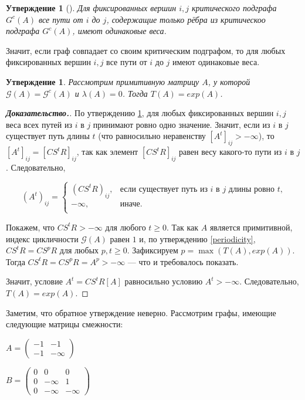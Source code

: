 \documentclass[12pt]{article}
\newtheorem{proposition}[theorem]{Утверждение}
\theoremstyle{definition}
\begin{document}
\begin{proposition} [{\cite[следствие 3.97]{synchronizationAndLinearity}}]
\label{sameWeight}
Для фиксированных вершин $i, j$ критического подграфа $G^c(A)$ все пути от $i$ до $j$, содержащие только рёбра из критическоо подграфа $G^c(A)$, имеют одинаковые веса.
\end{proposition}

Значит, если граф совпадает со своим критическим подграфом, то для любых фиксированных вершин $i, j$ все пути от $i$ до $j$ имеют одинаковые веса.

\begin{proposition} \label{onePathProposition}
Рассмотрим примитивную матрицу $A$, у которой $\mathcal{G}(A) = \mathcal{G}^c(A)$ и $\lambda(A) = 0$. Тогда $T(A) = exp(A)$.
\end{proposition}
\begin{proof}[\textbf{Доказательство.}]
По утверждению \ref{sameWeight}, для любых фиксированных вершин $i, j$ веса всех путей из $i$ в $j$ принимают ровно одно значение. Значит, если из $i$ в $j$ существует путь длины $t$ (что равносильно неравенству $[A^t]_{ij} > -\infty$), то $[A^t]_{ij} = [CS^tR]_{ij}$, так как элемент $[CS^tR]_{ij}$ равен весу какого-то пути из $i$ в $j$. Следовательно,

\begin{equation*}
(A^t)_{ij} = \begin{cases}(CS^tR)_{ij}, &\text{если существует путь из $i$ в $j$ длины ровно $t$,}\\
-\infty, & \text{иначе.}\\
\end{cases}
\end{equation*}

Покажем, что $CS^tR > -\infty$ для любого $t \ge 0$. Так как $A$ является примитивной, индекс цикличности $\mathcal{G}(A)$ равен $1$ и, по утверждению \ref{periodicity}, $CS^tR = CS^pR$ для любых $p, t \ge 0$. Зафиксируем $p = \max(T(A), exp(A))$. Тогда $CS^tR = CS^pR = A^p > -\infty$ --- что и требовалось показать.

Значит, условие $A^t = CS^tR[A]$ равносильно условию $A^t > -\infty$. Следовательно, $T(A) = exp(A)$.
\end{proof}

Заметим, что обратное утверждение неверно. Рассмотрим графы, имеющие следующие матрицы смежности:

\begin{minipage}[t]{0.4\textwidth}
\centering
$A = \begin{pmatrix}
    -1 & -1 \\
    -1 & -\infty
    \end{pmatrix}$
\end{minipage}
\begin{minipage}[t]{0.4\textwidth}
\centering
$B = \begin{pmatrix}
    0 & 0 & 0 \\
    0 & -\infty & 1 \\
    0 & -\infty & -\infty
    \end{pmatrix}$
\end{minipage}
\end{document}
